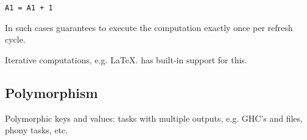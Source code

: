 \begin{verbatim}
A1 = A1 + 1
\end{verbatim}

In such cases \Excel guarantees to execute the computation exactly once per refresh cycle.

Iterative computations, e.g. LaTeX. \Excel has built-in support for this.


\subsection{Polymorphism}\label{sec-polymorphism}

Polymorphic keys and values: tasks with multiple outputs, e.g. GHC's 
and  files, phony tasks, etc.


